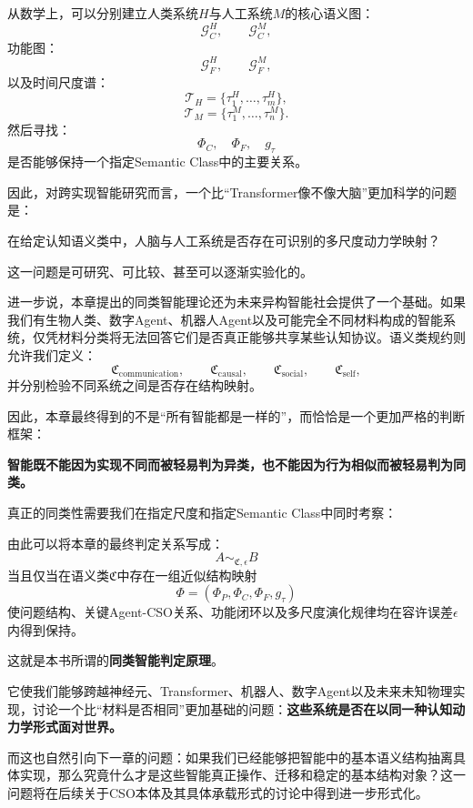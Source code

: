从数学上，可以分别建立人类系统$H$与人工系统$M$的核心语义图：
\[
\mathcal G_C^H,
\qquad
\mathcal G_C^M,
\]
功能图：
\[
\mathcal G_F^H,
\qquad
\mathcal G_F^M,
\]
以及时间尺度谱：
\[
\mathcal T_H
=
\{\tau_1^H,\dots,\tau_m^H\},
\]
\[
\mathcal T_M
=
\{\tau_1^M,\dots,\tau_n^M\}.
\]
然后寻找：
\[
\Phi_C,
\quad
\Phi_F,
\quad
g_\tau
\]
是否能够保持一个指定Semantic Class中的主要关系。

因此，对跨实现智能研究而言，一个比``Transformer像不像大脑''更加科学的问题是：
\begin{statementbox}
在给定认知语义类中，人脑与人工系统是否存在可识别的多尺度动力学映射？
\end{statementbox}

这一问题是可研究、可比较、甚至可以逐渐实验化的。

进一步说，本章提出的同类智能理论还为未来异构智能社会提供了一个基础。如果我们有生物人类、数字Agent、机器人Agent以及可能完全不同材料构成的智能系统，仅凭材料分类将无法回答它们是否真正能够共享某些认知协议。语义类规约则允许我们定义：
\[
\mathfrak C_{\mathrm{communication}},
\qquad
\mathfrak C_{\mathrm{causal}},
\qquad
\mathfrak C_{\mathrm{social}},
\qquad
\mathfrak C_{\mathrm{self}},
\]
并分别检验不同系统之间是否存在结构映射。

因此，本章最终得到的不是``所有智能都是一样的''，而恰恰是一个更加严格的判断框架：
\begin{proposition*}
\bfseries
智能既不能因为实现不同而被轻易判为异类，也不能因为行为相似而被轻易判为同类。
\end{proposition*}

真正的同类性需要我们在指定尺度和指定Semantic Class中同时考察：
\begin{statementbox}
\centering
{}
\end{statementbox}

由此可以将本章的最终判定关系写成：
\[
\boxed{
A
\sim_{\mathfrak C,\epsilon}
B
}
\]
当且仅当在语义类$\mathfrak C$中存在一组近似结构映射
\[
\Phi
=
(
\Phi_P,
\Phi_C,
\Phi_F,
g_\tau
)
\]
使问题结构、关键Agent-CSO关系、功能闭环以及多尺度演化规律均在容许误差$\epsilon$内得到保持。

这就是本书所谓的\textbf{同类智能判定原理}。

它使我们能够跨越神经元、Transformer、机器人、数字Agent以及未来未知物理实现，讨论一个比``材料是否相同''更加基础的问题：\textbf{这些系统是否在以同一种认知动力学形式面对世界。}

而这也自然引向下一章的问题：如果我们已经能够把智能中的基本语义结构抽离具体实现，那么究竟什么才是这些智能真正操作、迁移和稳定的基本结构对象？这一问题将在后续关于CSO本体及其具体承载形式的讨论中得到进一步形式化。
